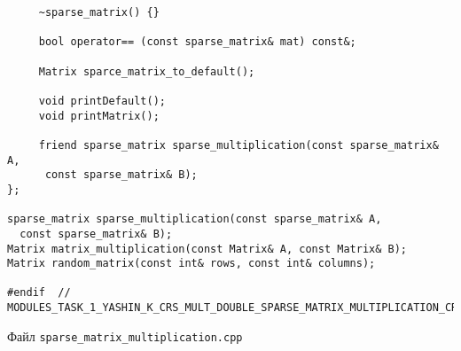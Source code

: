 \documentclass{report}
\begin{document}
\begin{lstlisting}
     ~sparse_matrix() {}

     bool operator== (const sparse_matrix& mat) const&;

     Matrix sparce_matrix_to_default();

     void printDefault();
     void printMatrix();

     friend sparse_matrix sparse_multiplication(const sparse_matrix& A,
      const sparse_matrix& B);
};

sparse_matrix sparse_multiplication(const sparse_matrix& A,
  const sparse_matrix& B);
Matrix matrix_multiplication(const Matrix& A, const Matrix& B);
Matrix random_matrix(const int& rows, const int& columns);

#endif  // MODULES_TASK_1_YASHIN_K_CRS_MULT_DOUBLE_SPARSE_MATRIX_MULTIPLICATION_CRS_H_

\end{lstlisting}
Файл \verb|sparse_matrix_multiplication.cpp|
\end{document}
